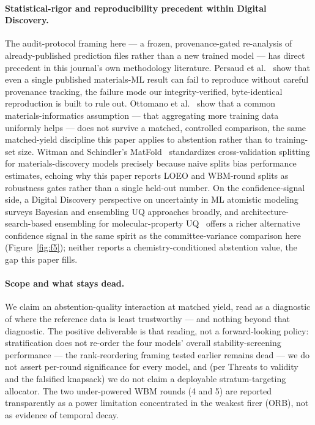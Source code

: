 \documentclass[11pt]{article}
\begin{document}
\paragraph{Statistical-rigor and reproducibility precedent within Digital Discovery.} The
audit-protocol framing here --- a frozen, provenance-gated re-analysis of already-published
prediction files rather than a new trained model --- has direct precedent in this journal's own
methodology literature. Persaud et al.~\citep{persaud2024reproducibility} show that even a single
published materials-ML result can fail to reproduce without careful provenance tracking, the
failure mode our integrity-verified, byte-identical reproduction is built to rule out. Ottomano
et al.~\citep{ottomano2024aggregation} show that a common materials-informatics assumption ---
that aggregating more training data uniformly helps --- does not survive a matched, controlled
comparison, the same matched-yield discipline this paper applies to abstention rather than to
training-set size. Witman and Schindler's {MatFold}~\citep{witman2025matfold} standardizes
cross-validation splitting for materials-discovery models precisely because naive splits bias
performance estimates, echoing why this paper reports LOEO and WBM-round splits as robustness
gates rather than a single held-out number. On the confidence-signal side, a Digital Discovery
perspective on uncertainty in ML atomistic modeling~\citep{grasselli2025uncertainty} surveys
Bayesian and ensembling UQ approaches broadly, and architecture-search-based ensembling for
molecular-property UQ~\citep{jiang2024autognnuq} offers a richer alternative confidence signal in
the same spirit as the committee-variance comparison here (Figure~\ref{fig:f5}); neither reports a
chemistry-conditioned abstention value, the gap this paper fills.

\paragraph{Scope and what stays dead.} We claim an abstention-quality interaction at
matched yield, read as a diagnostic of where the reference data is least trustworthy --- and
nothing beyond that diagnostic. The positive deliverable is that reading, not a forward-looking
policy: stratification does not re-order the four models' overall
stability-screening performance --- the rank-reordering framing tested earlier remains dead ---
we do not assert per-round significance for every model, and (per Threats to validity and the
falsified knapsack) we do not claim a deployable stratum-targeting allocator. The two under-powered WBM
rounds (4 and 5) are reported transparently as a power limitation concentrated in the weakest
firer (ORB), not as evidence of temporal decay.
\end{document}
